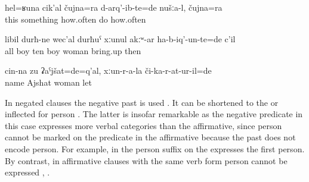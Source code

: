 \begin{exe}
	\ex	\label{ex:Things like this, how often did we do them, how often}
	\gll	hel=ʁuna	cik'al	čujna=ra	d-arq'-ib-te=de	nušːa-l,	čujna=ra\\
		this	something	how.often	do		how.often\\
	\glt	{}
	
	\ex	\label{ex:All children, ten children (he) rose without his wife then}
	\gll	libil	durħ-ne	wec'al	durħuˁ	xːunul	akːʷ-ar		ha-b-iq'-un-te=de	c'il\\
		all	boy	ten	boy	woman 		bring.up	then\\
	\glt	{}

	\ex	\label{ex:‎Her name was Ajshat, she was sent there as the (leader) of the women}
	\gll	cin-na	zu	ʡaˁjšat=de=q'al,	xːun-r-a-la	či-ka-r-at-ur-il=de\\
			name	Ajshat	woman	let\\
	\glt	{}
\end{exe}

In negated clauses the negative past   is used . It can be shortened to the    or inflected for person . The latter is insofar remarkable as the negative predicate in this case expresses more verbal categories than the affirmative, since person cannot be marked on the predicate in the affirmative because the past  does not encode person. For example, in  the person suffix on the  expresses the first person. By contrast, in affirmative clauses with the same verb form person cannot be expressed , .

